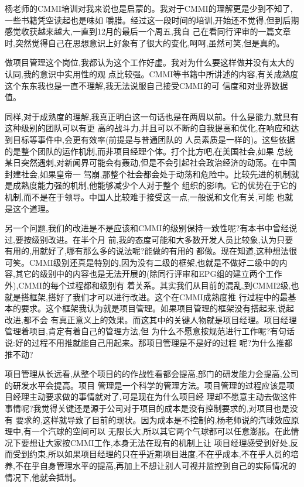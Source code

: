 \documentclass[11pt]{article}
\begin{document}
\begin{staff}
  \slogo 杨老师的CMMI培训对我来说也是启蒙的。我对于CMMI的理解更是少到不知了,一些书籍凭空读起也是味如
  嚼腊。经过这一段时间的培训,开始还不觉得,但到后期感觉收获越来越大,一直到12月的最后一个周五,我自
  己在看同行评审的一篇文章时,突然觉得自己在思想意识上好象有了很大的变化,呵呵,虽然可笑,但是真的。
     
  做项目管理这个岗位,我都认为这个工作好虚。我对为什么要这样做并没有太大的认同,我的意识中实用性的观
  点比较强。CMMI等书籍中所讲述的内容,有关成熟度这个东东我也是一直不理解,我无法说服自己接受CMMI的可
  信度和对业界数据值。
    
  同样,对于成熟度的理解,我真正明白这一句话也是在两周以前。什么是能力,就具有这种级别的团队可以有更
  高的战斗力,并且可以不断的自我提高和优化,在响应和达到目标等事件中,会更有效率(前提是与普通团队的
  人员素质是一样的)。这些依据的是整个团队的运作机制,而非项目经理个体。打个比方吧,在美国社会,如果
  总统某日突然遇刺,对新闻界可能会有轰动,但是不会引起社会政治经济的动荡。在中国封建社会,如果皇帝一
  驾崩,那整个社会都会处于动荡和危险中。比较先进的机制就是成熟度能力强的机制,他能够减少个人对于整个
  组织的影响。它的优势在于它的机制,而不是在于领导。中国人比较难于接受这一点,一般说和文化有关,可能
  也就是这个道理。

  另一个问题,我们的改进是不是应该和CMMI的级别保持一致性呢?有本书中曾经说过,要按级别改进。在半个月
  前,我的态度可能和大多数开发人员比较象,认为只要有用的,用就好了,哪有那么多的说法呢?能做的有用的
  都做。现在知道,这种想法很可笑。CMMI级别还真是特别的,因为没有二级的框架,也就是不做好二级中的内
  容,其它的级别中的内容也是无法开展的(除同行评审和EPG组的建立两个工作外),CMMI的每个过程都和级别有
  着关系。其实我们从目前的混乱,到CMMI2级,也就是搭框架,搭好了我们才可以进行改进。这个在CMMI成熟度推
  行过程中的最基本的要求。这个框架我认为就是项目管理。如果项目管理的框架没有搭起来,说起改进,都不会
  有真正意义上的效果。而这其中的关键人物就是项目经理。项目经理管理着项目,肯定有着自己的管理方法,但
  为什么不愿意按规范进行工作呢?有句话说:好的过程不用推就能自己用起来。那项目管理是不是好的过程
  呢?为什么推都推不动?

  项目管理从长远看,从整个项目的的作战性看都会提高,部门的研发能力会提高,公司的研发水平会提高。项目
  管理是一个科学的管理方法。项目管理的过程应该是项目经理主动要求做的事情就对了,可是现在为什么项目经
  理却不愿意主动去做这件事情呢?我觉得关键还是源于公司对于项目的成本是没有控制要求的,对项目也是没有
  要求的,这样就导致了目前的现状。因为成本是不控制的,杨老师说的汽球效应原理中,有一个汽球的空间可以
  无限长大,所以其它两个气球都可以任意澎胀。在此情况下要想让大家按CMMI工作,本身无法在现有的机制上让
  项目经理感受到好处,反而受到约束,所以如果项目经理的只在乎近期项目进度,不在乎成本,不在乎人员的培
  养,不在乎自身管理水平的提高,再加上不想让别人可视并监控到自己的实际情况的情况下,他就会抵制。


\end{staff}
\end{document}
